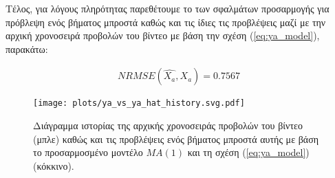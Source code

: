 \par Τέλος, για λόγους πληρότητας παρεθέτουμε το  των σφαλμάτων προσαρμογής
για πρόβλεψη ενός βήματος μπροστά καθώς και τις ίδιες τις προβλέψεις μαζί με την αρχική χρονοσειρά προβολών του βίντεο  με βάση την σχέση (\ref{eq:ya_model}), παρακάτω:

\begin{align}
NRMSE(\hat{X_a}, X_a) = 0.7567
\end{align}

\begin{figure}[H]
    \begin{center}
        \texttt{[image: plots/ya\_vs\_ya\_hat\_history.svg.pdf]}
        \caption{Διάγραμμα ιστορίας της αρχικής χρονοσειράς προβολών του βίντεο (μπλε)  καθώς και τις προβλέψεις ενός βήματος μπροστά αυτής με βάση το προσαρμοσμένο μοντέλο $MA(1)$ και τη σχέση (\ref{eq:ya_model}) (κόκκινο).}
        \label{fig:ya_vs_ya_hat_history}
    \end{center}
\end{figure}
